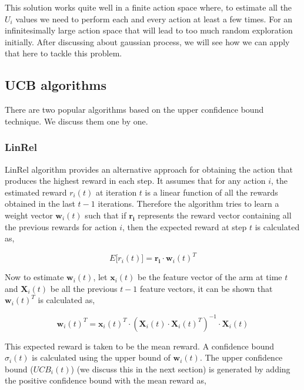 \documentclass[english]{tktltiki}
\begin{document}
This solution works quite well in a finite action space where, to estimate all the $U_i$ values we need to perform each and every action at least a few times. For an infinitesimally large action space that will lead to too much random exploration initially. After discussing about gaussian process, we will see how we can apply that here to tackle this problem.

\subsection{UCB algorithms}

There are two popular algorithms based on the upper confidence bound technique. We discuss them one by one.

\subsubsection{LinRel}

LinRel algorithm \cite{linrel} provides an alternative approach for obtaining the action that produces the highest reward in each step. It assumes that for any action $i$, the estimated reward $r_i(t)$ at iteration $t$ is a linear function of all the rewards obtained in the last $t-1$ iterations. Therefore the algorithm tries to learn a weight vector $\mathbf{w}_i(t)$ such that if $\mathbf{r_i}$ represents the reward vector containing all the previous rewards for action $i$, then the expected reward at step $t$ is calculated as,

\begin{equation}
E\big[r_i(t)\big] = \mathbf{r_i} \cdot \mathbf{w}_i(t)^T
\end{equation}

Now to estimate $\mathbf{w}_i(t)$, let $\mathbf{x}_i(t)$ be the feature vector of the arm at time $t$ and $\mathbf{X}_i(t)$ be all the previous $t-1$ feature vectors, it can be shown that $\mathbf{w}_i(t)^T$ is calculated as,

\begin{equation}
\mathbf{w}_i(t)^T = \mathbf{x}_i(t)^T \cdot (\mathbf{X}_i(t) \cdot \mathbf{X}_i(t)^T)^{-1} \cdot \mathbf{X}_i(t)
\end{equation}


This expected reward is taken to be the mean reward. A confidence bound $\sigma_i(t)$ is calculated using the upper bound of $\mathbf{w}_i(t)$. The upper confidence bound ($UCB_i(t)$) \cite{ucb} (we discuss this in the next section) is generated by adding the positive confidence bound with the mean reward as,
\end{document}
